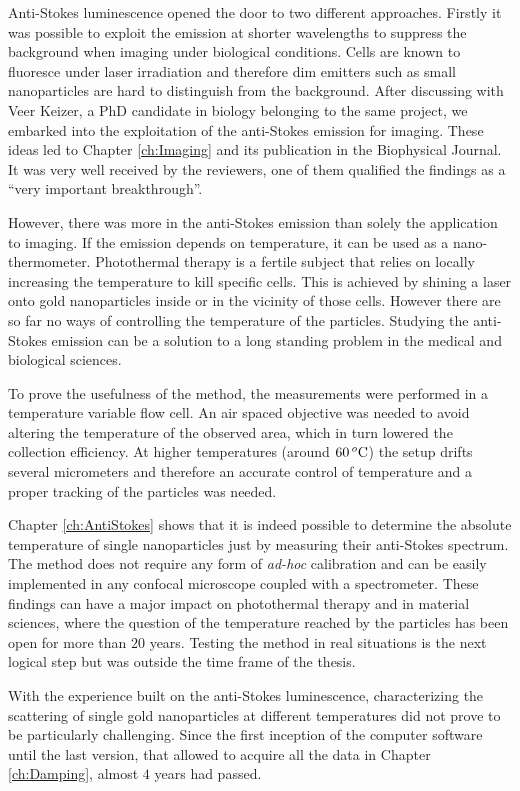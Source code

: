 Anti-Stokes luminescence opened the door to two different approaches. Firstly it
was possible to exploit the emission at shorter wavelengths to suppress the
background when imaging under biological conditions. Cells are known to
fluoresce under laser irradiation and therefore dim emitters such as small nanoparticles
are hard to distinguish from the background. After discussing with Veer Keizer,
a PhD candidate in biology belonging to the same project, we embarked into the
exploitation of the anti-Stokes emission for imaging. These ideas led to
Chapter \ref{ch:Imaging} and its publication in the Biophysical Journal. It was
very well received by the reviewers, one of them qualified the findings as
a ``very important breakthrough''.

However, there was more in the anti-Stokes emission than solely the application
to imaging. If the emission depends on temperature, it can be used as a
nano-thermometer. Photothermal therapy is a fertile subject that relies on
locally increasing the temperature to kill specific cells. This is achieved by
shining a laser onto gold nanoparticles inside or in the vicinity of those
cells. However there are so far no ways of controlling the temperature of the
particles. Studying the anti-Stokes emission can be a solution to a long
standing problem in the medical and biological sciences.

To prove the usefulness of the method, the measurements were performed in a
temperature variable flow cell. An air spaced objective was needed to avoid
altering the temperature of the observed area, which in turn lowered the
collection efficiency. At higher temperatures (around $60\,^o\textrm{C}$) the setup
drifts several micrometers and therefore an accurate control of temperature and
a proper tracking of the particles was needed. 

Chapter \ref{ch:AntiStokes} shows that it is indeed possible to determine the
absolute temperature of single nanoparticles just by measuring their anti-Stokes
spectrum. The method does not require any form of \textit{ad-hoc} calibration
and can be easily implemented in any confocal microscope coupled with a
spectrometer. These findings can have a major impact on photothermal therapy and
in material sciences, where the question of the temperature reached by the
particles has been open for more than $20$ years. Testing the method in real
situations is the next logical step but was outside the time frame of the
thesis.

With the experience built on the anti-Stokes luminescence, characterizing the
scattering of single gold nanoparticles at different temperatures did not prove
to be particularly challenging. Since the first inception of the computer
software until the last version, that allowed to acquire all the data in Chapter
\ref{ch:Damping}, almost $4$ years had passed. 


